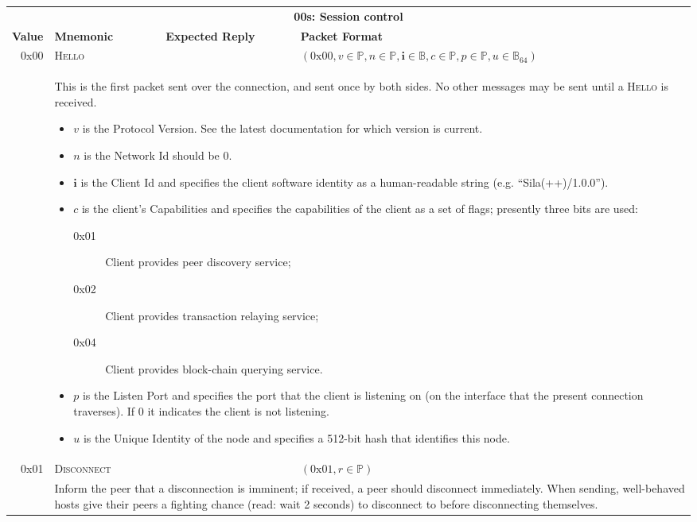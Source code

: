 \begin{tabular*}{\columnwidth}[h]{rlll}
\toprule
\multicolumn{4}{c}{\textbf{00s: Session control}} \vspace{5pt} \\
\textbf{Value} & \textbf{Mnemonic} & \textbf{Expected Reply} & \textbf{Packet Format} \vspace{5pt} \\
0x00 & \textsc{Hello} & & $(\text{0x}00, v \in \mathbb{P}, n \in \mathbb{P}, \mathbf{i} \in \mathbb{B}, c \in \mathbb{P}, p \in \mathbb{P}, u \in \mathbb{B}_{64})$ \\
& \multicolumn{3}{p{0.8\columnwidth}}{
This is the first packet sent over the connection, and sent once by both sides. No other messages may be sent until a \textsc{Hello} is received.
\begin{itemize}
\item $v$ is the Protocol Version. See the latest documentation for which version is current.
\item $n$ is the Network Id should be 0.
\item $\mathbf{i}$ is the Client Id and specifies the client software identity as a human-readable string (e.g. ``Sila(++)/1.0.0'').
\item $c$ is the client's Capabilities and specifies the capabilities of the client as a set of flags; presently three bits are used:
\begin{description}
\item[0x01] Client provides peer discovery service;
\item[0x02] Client provides transaction relaying service;
\item[0x04] Client provides block-chain querying service.
\end{description}
\item $p$ is the Listen Port and specifies the port that the client is listening on (on the interface that the present connection traverses). If 0 it indicates the client is not listening.
\item $u$ is the Unique Identity of the node and specifies a 512-bit hash that identifies this node.
\end{itemize}
}\\
\midrule
0x01 & \textsc{Disconnect} && $(\text{0x}01, r \in \mathbb{P})$ \\
& \multicolumn{3}{p{0.8\columnwidth}}{
Inform the peer that a disconnection is imminent; if received, a peer should disconnect immediately. When sending, well-behaved hosts give their peers a fighting chance (read: wait 2 seconds) to disconnect to before disconnecting themselves.
}
\end{tabular*}
